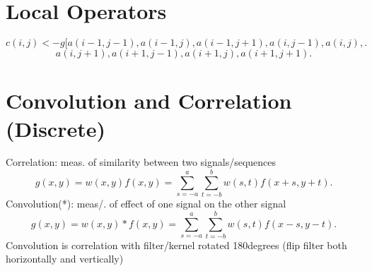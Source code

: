 \documentclass[a4paper]{article}
\begin{document}
	\section{Local Operators}
	\[
		c(i,j) <- g[a(i-1,j-1),a(i-1,j),a(i-1,j+1),a(i,j-1),a(i,j),
	.\]
	\[
		a(i,j+1),a(i+1,j-1),a(i+1,j),a(i+1,j+1)
	.\]
	\section{Convolution and Correlation (Discrete)}
	Correlation: meas. of similarity between two signals/sequences
	\[
		g(x,y)=w(x,y)f(x,y)=\sum_{s=-a}^{a} \sum_{t=-b}^{b}
		w(s,t)f(x+s,y+t)
	.\]
	Convolution(*): meas/. of effect of one signal on the other signal
	\[
		g(x,y)=w(x,y)*f(x,y)=\sum_{s=-a}^{a} \sum_{t=-b}^{b}
		w(s,t)f(x-s,y-t)
	.\]
	Convolution is correlation with filter/kernel rotated 180degrees (flip
	filter both horizontally and vertically)
\end{document}
